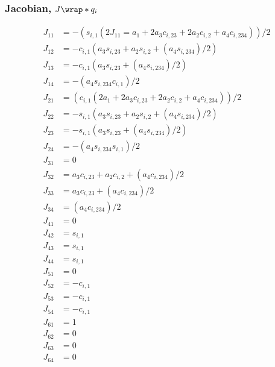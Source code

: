 
\subsubsection{Jacobian, $J\wrap*{q_{i}}$}
\begin{equation}
	\begin{split}
		J_{11} & = -(s_{i,1} (2 J_{11} = a_{1} + 2 a_{3} c_{i,23} + 2 a_{2} c_{i,2} + a_{4} c_{i,234}))/2	\\	
		J_{12} & = -c_{i,1} (a_{3} s_{i,23} + a_{2} s_{i,2} + (a_{4} s_{i,234})/2)		\\
		J_{13} & = -c_{i,1} (a_{3} s_{i,23} + (a_{4} s_{i,234})/2)		\\
		J_{14} & = -(a_{4} s_{i,234} c_{i,1})/2\\
		J_{21} & = (c_{i,1} (2 a_{1} + 2 a_{3} c_{i,23} + 2 a_{2} c_{i,2} + a_{4} c_{i,234}))/2	\\
		J_{22} & = -s_{i,1} (a_{3} s_{i,23} + a_{2} s_{i,2} + (a_{4} s_{i,234})/2)	\\
		J_{23} & = -s_{i,1} (a_{3} s_{i,23} + (a_{4} s_{i,234})/2)		\\
		J_{24} & = -(a_{4} s_{i,234} s_{i,1})/2\\
		J_{31} & = 0		\\
		J_{32} & = a_{3} c_{i,23} + a_{2} c_{i,2} + (a_{4} c_{i,234})/2		\\
		J_{33} & = a_{3} c_{i,23} + (a_{4} c_{i,234})/2	\\
		J_{34} & = (a_{4} c_{i,234})/2\\
		J_{41} & = 0		\\
		J_{42} & = s_{i,1}	\\	
		J_{43} & = s_{i,1}	\\	
		J_{44} & = s_{i,1}\\
		J_{51} & = 0		\\
		J_{52} & = -c_{i,1}	\\	
		J_{53} & = -c_{i,1}	\\	
		J_{54} & = -c_{i,1}\\
		J_{61} & = 1		\\
		J_{62} & = 0		\\
		J_{63} & = 0		\\
		J_{64} & = 0\\
	\end{split}
	\label{eq::jac}
\end{equation}